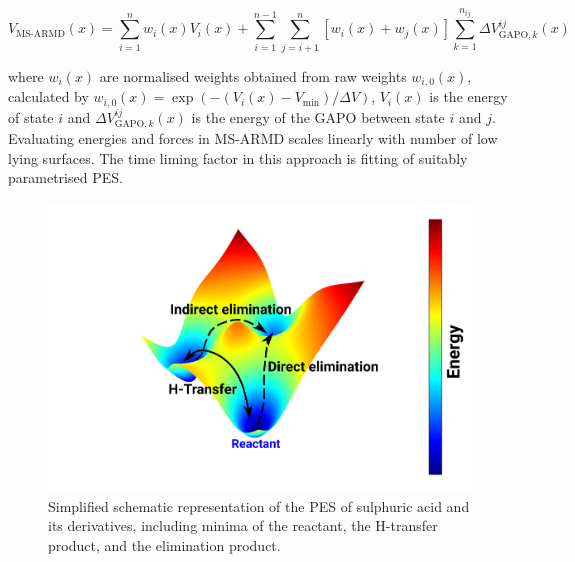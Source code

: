 \documentclass[journal=jacsat,manuscript=article]{achemso}
\begin{document}
\begin{equation}
V_{\text{MS-ARMD}}(x) =\sum_{i=1}^n w_i(x)V_i(x) + \sum_{i=1}^{n-1} \sum_{j=i+1}^n [w_i(x)+w_j(x)]  \sum_{k=1}^{n_{ij}} \Delta V_{\text{GAPO},k}^{ij} (x) 	\label{eq:msarmd}
\end{equation}

\noindent
where $w_i(x)$ are normalised weights obtained from raw weights $w_{i,0}(x)$, calculated by $w_{i,0}(x) = \exp (- (V_i(x) - V_{\text{min}})/ \Delta V)$, $V_i(x)$ is the energy of state $i$ and $\Delta V_{\text{GAPO},k}^{ij} (x)$ is the energy of the GAPO between state $i$ and $j$. Evaluating energies and forces in MS-ARMD scales linearly with number of low lying surfaces. The time liming factor in this approach is fitting of suitably parametrised PES.\\

\begin{figure}
	\includegraphics[width=\textwidth]{fig/msarmd-sulphonics.png}
	\caption{Simplified schematic representation of the PES of sulphuric acid and its derivatives, including minima of the reactant, the H-transfer product, and the elimination product.}
	\label{fig:msarmdsulphonic}
\end{figure}
\end{document}
